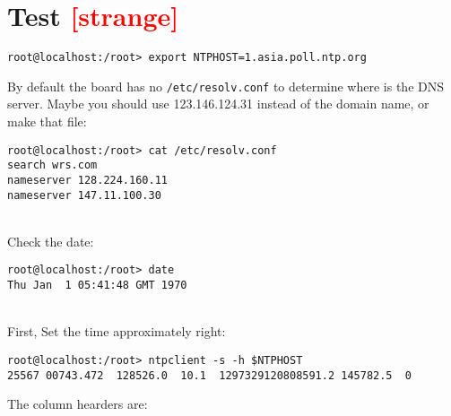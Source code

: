 \documentclass[a4paper]{report}
\begin{document}
\section{Test \textcolor{red}{[strange]}}
\begin{lstlisting}
root@localhost:/root> export NTPHOST=1.asia.poll.ntp.org
\end{lstlisting}
By default the board has no {\tt /etc/resolv.conf} to determine where is the DNS server.
Maybe you should use 123.146.124.31 instead of the domain name, or make that file:
\begin{lstlisting}
root@localhost:/root> cat /etc/resolv.conf 
search wrs.com
nameserver 128.224.160.11
nameserver 147.11.100.30
\end{lstlisting}\null\\
Check the date:
\begin{lstlisting}
root@localhost:/root> date
Thu Jan  1 05:41:48 GMT 1970
\end{lstlisting}\null\\
First, Set the time approximately right:
\begin{lstlisting}
root@localhost:/root> ntpclient -s -h $NTPHOST
25567 00743.472  128526.0  10.1  1297329120808591.2 145782.5  0
\end{lstlisting}
The column hearders are:
\end{document}
